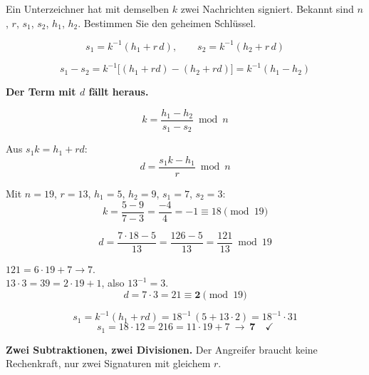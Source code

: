 \begin{aufgabe}
Ein Unterzeichner hat mit demselben $k$ zwei Nachrichten signiert. Bekannt sind $n$, $r$, $s_1$, $s_2$, $h_1$, $h_2$. Bestimmen Sie den geheimen Schlüssel.

\loesung
{}
\[ s_1 = k^{-1}(h_1+r\,d), \qquad s_2 = k^{-1}(h_2+r\,d) \]

\[ s_1-s_2 = k^{-1}\bigl[(h_1+rd)-(h_2+rd)\bigr] = k^{-1}(h_1-h_2) \]

\begin{center}
\begin{minipage}{0.9\textwidth}
\textbf{Der Term mit $d$ fällt heraus.}
\end{minipage}
\end{center}

\[ k = \frac{h_1-h_2}{s_1-s_2} \bmod n \]

Aus $s_1 k = h_1 + r d$:
\[ d = \frac{s_1 k - h_1}{r} \bmod n \]

Mit $n = 19$, $r = 13$, $h_1 = 5$, $h_2 = 9$, $s_1 = 7$, $s_2 = 3$:
\[ k = \frac{5-9}{7-3} = \frac{-4}{4} = -1 \equiv 18 \pmod{19} \]

\[ d = \frac{7\cdot18-5}{13} = \frac{126-5}{13} = \frac{121}{13} \bmod 19 \]

 $121 = 6\cdot19+7 \to 7$.\\
 $13\cdot3 = 39 = 2\cdot19+1$, also $13^{-1} = 3$.
\[ d = 7\cdot3 = 21 \equiv \mathbf{2} \pmod{19} \]

\[ s_1 = k^{-1}(h_1+rd) = 18^{-1}\,(5+13\cdot2) = 18^{-1}\cdot31 \]
\[ s_1 = 18\cdot12 = 216 = 11\cdot19+7 \ \to\ \mathbf{7} \quad \checkmark \]

\begin{center}
\begin{minipage}{0.9\textwidth}
\textbf{Zwei Subtraktionen, zwei Divisionen.} Der Angreifer braucht keine Rechenkraft, nur zwei Signaturen mit gleichem $r$.
\end{minipage}
\end{center}

\begin{center}
\begin{minipage}{0.88\textwidth}
\end{minipage}
\end{center}


\end{aufgabe}
